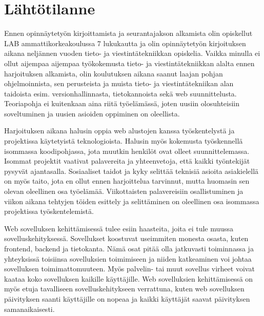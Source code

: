\documentclass[11pt,a4paper,titlepage,oneside]{article}
\begin{document}
\newpage
\section{Lähtötilanne}         %




Ennen opinnäytetyön kirjoittamista ja seurantajakson alkamista olin opiskellut LAB ammattikorkeakoulussa 7 lukukautta ja
olin opinnäytetyön kirjoituksen aikana neljännen vuoden tieto- ja viestintätekniikkan opiskelia.
Vaikka minulla ei ollut aijempaa aijempaa työkokemusta tieto- ja viestintätekniikkan alalta ennen harjoituksen alkamista,
olin koulutuksen aikana saanut laajan pohjan ohjelmoinnista,
sen perusteista ja muista tieto- ja viestintätekniikan alan taidoista esim. versionhallinnasta, tietokannoista sekä web suunnittelusta.
Teoriapohja ei kuitenkaan aina riitä työelämässä, joten uusiin olosuhteisiin soveltuminen ja uusien asioiden oppiminen on oleellista.
\medskip



Harjoituksen aikana halusin oppia web alustojen kanssa työskentelystä ja projektissa käytetyistä teknologioista.
Halusin myös kokemusta työskennellä isommassa koodipohjassa, jota muutkin henkilöt ovat olleet suunnittelemassa.
Isommat projektit vaativat palavereita ja yhteenvetoja, että kaikki työntekijät pysyvät ajantasalla.
Sosiaaliset taidot ja kyky selittää teknisiä asioita asiakielellä on myös taito, 
jota en ollut ennen harjoittelua tarvinnut, mutta huomasin sen olevan oleellinen osa työelämää.
Viikottaisten palavereisiin osallistuminen ja viikon aikana tehtyjen töiden esittely ja selittäminen on oleellinen osa isommassa projektissa työskentelemistä.
\medskip


Web sovelluksen kehittämisessä tulee esiin haasteita, joita ei tule muussa sovelluskehityksessä.
Sovellukset koostuvat useimmiten monesta osasta, kuten frontend, backend ja tietokanta.
Nämä osat pitää olla jatkuvasti toiminnassa ja yhteyksissä toisiinsa sovelluksien toimimiseen ja niiden katkeaminen voi
johtaa sovelluksen toimimattomuuteen.
% 
Myös palvelin- tai muut sovellus virheet voivat kaataa koko sovelluksen kaikille käyttäjille. 
%
Web sovelluksien kehittämisessä on myös etuja tavalliseen sovelluskehitykseen verrattuna, kuten 
web sovelluksen päivityksen saanti käyttäjille on nopeaa ja kaikki käyttäjät saavat päivityksen samanaikaisesti.
\medskip
\end{document}
